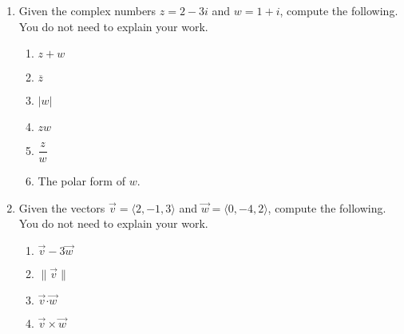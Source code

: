 \documentclass[12pt]{article}
\newcommand{\points}[1]{\marginpar{\hspace{24pt}[#1]}}
\newcommand{\dotp}{\boldsymbol{\cdot}}
\newcommand{\abs}[1]{\lvert #1\rvert}
\newcommand{\len}[1]{\lVert #1\rVert}
\begin{document}
\begin{enumerate}
\item Given the complex numbers $z=2-3i$ and $w=1+i$, compute the following. You do not need to explain your work.
 \begin{enumerate}
\item $z+w$ \points{2}

\vspace{1in}

\item $\overline{z}$ \points{2}

\vspace{0.75in}

\item $\abs{w}$ \points{2}

\vspace{1in}

\item $zw$ \points{2}

\vspace{1.25in}

\item $\dfrac{z}{w}$ \points{3}

\vspace{1.5in}

\item The polar form of $w$. \points{3}
\end{enumerate}

\newpage

\item Given the vectors $\vec{v} = \langle 2, -1, 3\rangle$ and $\vec{w} = \langle 0, -4, 2\rangle$, compute the following. You do not need to explain your work.
\begin{enumerate}
 \item $\vec{v}-3\vec{w}$  \points{2}

\vspace{1in}
  
 \item $\len{\vec{v}}$ \points{2}

\vspace{1in}

 \item $\vec{v}\dotp\vec{w}$ \points{2}

\vspace{1in}

 \item $\vec{v}\times \vec{w}$ \points{4}

\vspace{2in}


\end{enumerate}
\end{enumerate}
\end{document}

